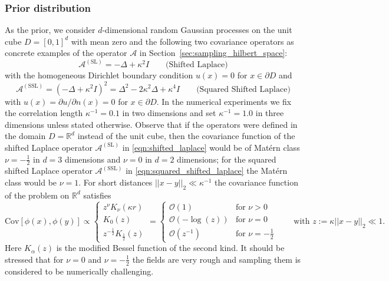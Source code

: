 \documentclass[11pt,english]{article}
\theoremstyle{plain}
\theoremstyle{plain}
\theoremstyle{plain}
\theoremstyle{plain}
\numberwithin{equation}{section}
\newcommand*{\id}{I}
\newcommand{\rev}[1]{#1}
\begin{document}
\subsubsection{Prior distribution}\label{sec:prior}
As the prior, we consider $d$-dimensional random Gaussian processes on the unit cube \rev{$D=[0,1]^d$} with mean zero and the following two covariance operators as concrete examples of the operator $\mathcal{A}$ in Section~\ref{sec:sampling_hilbert_space}:
\begin{equation}
    \mathcal{A}^{\mathrm{(SL)}} = -\Delta + \kappa^2\id\qquad \text{(Shifted Laplace)}
    \label{eqn:shifted_laplace}
\end{equation}
with the homogeneous Dirichlet boundary condition $u(x)=0$ for $x\in\partial \rev{D}$ and
\begin{equation}
    \mathcal{A}^{\mathrm{(SSL)}} = (-\Delta + \kappa^2\id)^2=\Delta^2-2\kappa^2\Delta + \kappa^4\id\qquad \text{(Squared Shifted Laplace)}
    \label{eqn:squared_shifted_laplace}
\end{equation}
with $u(x)=\partial{u}/\partial n(x)=0$ for $x\in\partial \rev{D}$. In the numerical experiments we fix the correlation length $\kappa^{-1}=0.1$ in two dimensions and set $\kappa^{-1}=1.0$ in three dimensions unless stated otherwise. Observe that if the operators were defined in the domain $D=\mathbb{R}^d$ instead of the unit cube, then the covariance function of the shifted Laplace operator $\mathcal{A}^{\mathrm{(SL)}}$ in \eqref{eqn:shifted_laplace} would be of Mat\'ern class $\nu=-\frac{1}{2}$ in $d=3$ dimensions and $\nu=0$ in $d=2$ dimensions; for the squared shifted Laplace operator $\mathcal{A}^{(\mathrm{SSL})}$ in \eqref{eqn:squared_shifted_laplace} the Mat\'ern class would be $\nu=1$. For short distances $||x-y||_2\ll \kappa^{-1}$ the covariance function of the problem on $\mathbb{R}^d$ satisfies
\begin{equation}
    \mathrm{Cov}[\phi(x),\phi(y)] \propto \begin{cases}
        z^\nu K_\nu(\kappa r) \\
        K_0(z)                \\
        z^{-\frac{1}{2}}K_{\frac{1}{2}}(z)
    \end{cases}
    =
    \begin{cases}
        \mathcal{O}(1)        & \text{for $\nu>0$}            \\
        \mathcal{O}(-\log(z)) & \text{for $\nu=0$}            \\
        \mathcal{O}(z^{-1})   & \text{for $\nu=-\frac{1}{2}$}
    \end{cases}
    \qquad\text{with $z:=\kappa||x-y||_2\ll 1$.}
\end{equation}
Here $K_\alpha(z)$ is the modified Bessel function of the second kind. It should be stressed that for $\nu=0$ and $\nu=-\frac{1}{2}$ the fields are very rough and sampling them is considered to be numerically challenging.
\end{document}
